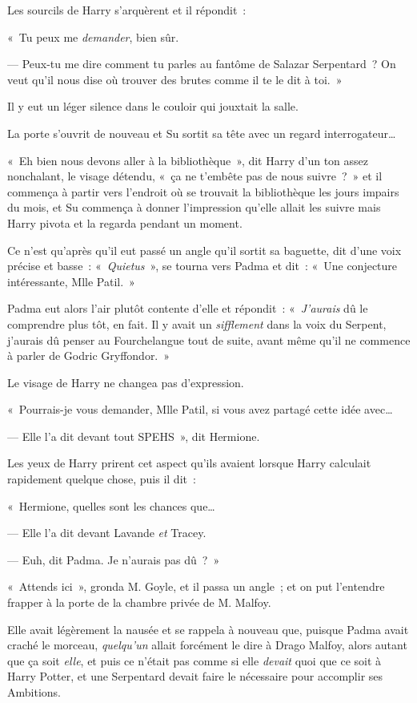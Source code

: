 Les sourcils de Harry s'arquèrent et il répondit~:

«~Tu peux me \emph{demander}, bien sûr.

--- Peux-tu me dire comment tu parles au fantôme de Salazar Serpentard~?
On veut qu'il nous dise où trouver des brutes comme il te le dit à toi.~»

Il y eut un léger silence dans le couloir qui jouxtait la salle.

La porte s'ouvrit de nouveau et Su sortit sa tête avec un regard interrogateur…

«~Eh bien nous devons aller à la bibliothèque~», dit Harry d'un ton assez nonchalant, le visage détendu, «~ça ne t'embête pas de nous suivre~?~»
et il commença à partir vers l'endroit où se trouvait la bibliothèque les jours impairs du mois, et Su commença à donner l'impression qu'elle allait les suivre mais Harry pivota et la regarda pendant un moment.

Ce n'est qu'après qu'il eut passé un angle qu'il sortit sa baguette, dit d'une voix précise et basse~: «~\emph{Quietus}~», se tourna vers Padma et dit~: «~Une conjecture intéressante, Mlle Patil.~»

Padma eut alors l'air plutôt contente d'elle et répondit~: «~\emph{J'aurais} dû le comprendre plus tôt, en fait.
Il y avait un \emph{sifflement} dans la voix du Serpent, j'aurais dû penser au Fourchelangue tout de suite, avant même qu'il ne commence à parler de Godric Gryffondor.~»

Le visage de Harry ne changea pas d'expression.

«~Pourrais-je vous demander, Mlle Patil, si vous avez partagé cette idée avec…

--- Elle l'a dit devant tout SPEHS~», dit Hermione.

Les yeux de Harry prirent cet aspect qu'ils avaient lorsque Harry calculait rapidement quelque chose, puis il dit~:

«~Hermione, quelles sont les chances que…

--- Elle l'a dit devant Lavande \emph{et} Tracey.

--- Euh, dit Padma.
Je n'aurais pas dû~?~»

\later

«~Attends ici~», gronda M. Goyle, et il passa un angle~; et on put l'entendre frapper à la porte de la chambre privée de M. Malfoy.

Elle avait légèrement la nausée et se rappela à nouveau que, puisque Padma avait craché le morceau, \emph{quelqu'un} allait forcément le dire à Drago Malfoy, alors autant que ça soit \emph{elle}, et puis ce n'était pas comme si elle \emph{devait} quoi que ce soit à Harry Potter, et une Serpentard devait faire le nécessaire pour accomplir ses Ambitions.

